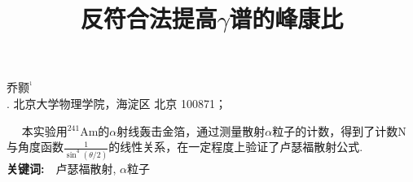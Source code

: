 \documentclass[a4paper,10.0pt,twoside]{npr}
\begin{document}
\setcounter{page}{001}%
\begin{center}
\title{%
\xiaoerhao \bf  %
反符合法提高$\gamma$谱的峰康比\\[-5mm]}
\maketitle
\large \fs
乔颢$^{^1}$\\[2mm]

\xiaowu {}. 北京大学物理学院，海淀区 北京 100871；\\[4mm]

 

\parbox{158mm} {
~~\fs
本实验用$^{241}$Am的$\alpha$射线轰击金箔，通过测量散射$\alpha$粒子的计数，得到了计数N与角度函数$\frac{1}{\sin^4(\theta/2)}$的线性关系，在一定程度上验证了卢瑟福散射公式. \\

{\bf 关键词:}~~\fs 卢瑟福散射, $\alpha$粒子}\\
\end{center}
\vspace{5mm}
\setcounter{section}{0}
\end{document}
